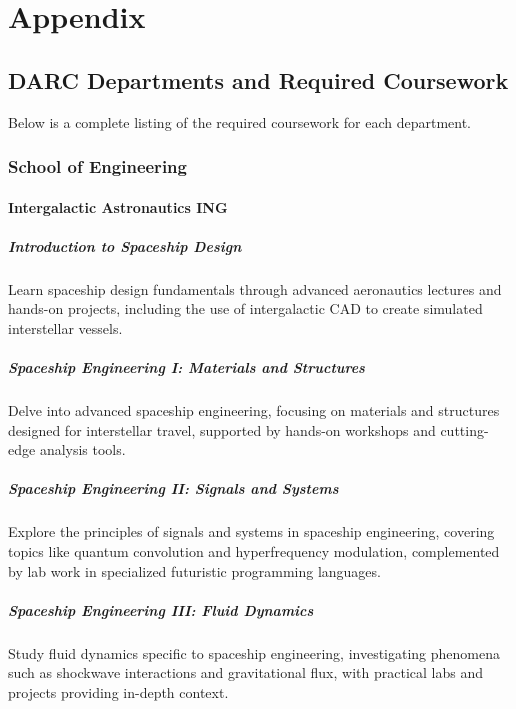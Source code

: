 
\part{Appendix}

\chapter{DARC Departments and Required Coursework}\label{Coursework}

Below is a complete listing of the required coursework for each department.


\section{School of Engineering}


\subsection{Intergalactic Astronautics \hfill ING}
\subsubsection{Introduction to Spaceship Design}
Learn spaceship design fundamentals through advanced aeronautics lectures and hands-on projects, including the use of intergalactic CAD to create simulated interstellar vessels.
\subsubsection{Spaceship Engineering I: Materials and Structures}
Delve into advanced spaceship engineering, focusing on materials and structures designed for interstellar travel, supported by hands-on workshops and cutting-edge analysis tools.
\subsubsection{Spaceship Engineering II: Signals and Systems}
Explore the principles of signals and systems in spaceship engineering, covering topics like quantum convolution and hyperfrequency modulation, complemented by lab work in specialized futuristic programming languages.
\subsubsection{Spaceship Engineering III: Fluid Dynamics}
Study fluid dynamics specific to spaceship engineering, investigating phenomena such as shockwave interactions and gravitational flux, with practical labs and projects providing in-depth context.
